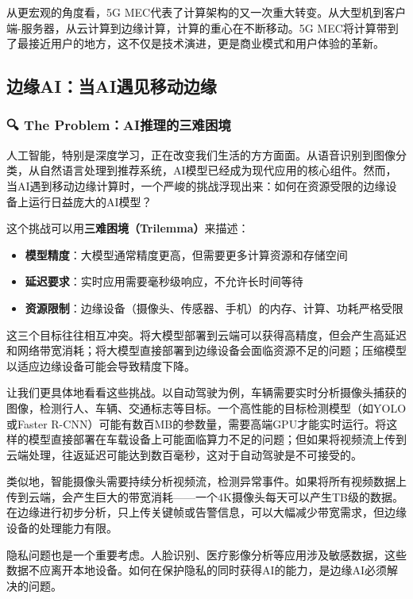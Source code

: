 从更宏观的角度看，5G MEC代表了计算架构的又一次重大转变。从大型机到客户端-服务器，从云计算到边缘计算，计算的重心在不断移动。5G MEC将计算带到了最接近用户的地方，这不仅是技术演进，更是商业模式和用户体验的革新。

\subsection{边缘AI：当AI遇见移动边缘}

\subsubsection{🔍 The Problem：AI推理的三难困境}

人工智能，特别是深度学习，正在改变我们生活的方方面面。从语音识别到图像分类，从自然语言处理到推荐系统，AI模型已经成为现代应用的核心组件。然而，当AI遇到移动边缘计算时，一个严峻的挑战浮现出来：如何在资源受限的边缘设备上运行日益庞大的AI模型？

这个挑战可以用\textbf{三难困境（Trilemma）}来描述：

\begin{itemize}
    \item \textbf{模型精度}：大模型通常精度更高，但需要更多计算资源和存储空间
    \item \textbf{延迟要求}：实时应用需要毫秒级响应，不允许长时间等待
    \item \textbf{资源限制}：边缘设备（摄像头、传感器、手机）的内存、计算、功耗严格受限
\end{itemize}

这三个目标往往相互冲突。将大模型部署到云端可以获得高精度，但会产生高延迟和网络带宽消耗；将大模型直接部署到边缘设备会面临资源不足的问题；压缩模型以适应边缘设备可能会导致精度下降。

让我们更具体地看看这些挑战。以自动驾驶为例，车辆需要实时分析摄像头捕获的图像，检测行人、车辆、交通标志等目标。一个高性能的目标检测模型（如YOLO或Faster R-CNN）可能有数百MB的参数量，需要高端GPU才能实时运行。将这样的模型直接部署在车载设备上可能面临算力不足的问题；但如果将视频流上传到云端处理，往返延迟可能达到数百毫秒，这对于自动驾驶是不可接受的。

类似地，智能摄像头需要持续分析视频流，检测异常事件。如果将所有视频数据上传到云端，会产生巨大的带宽消耗——一个4K摄像头每天可以产生TB级的数据。在边缘进行初步分析，只上传关键帧或告警信息，可以大幅减少带宽需求，但边缘设备的处理能力有限。

隐私问题也是一个重要考虑。人脸识别、医疗影像分析等应用涉及敏感数据，这些数据不应离开本地设备。如何在保护隐私的同时获得AI的能力，是边缘AI必须解决的问题。

